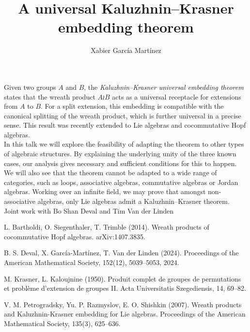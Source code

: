 \documentclass[11pt]{amsart}   %
\title{A universal Kaluzhnin--Krasner\\ embedding theorem}
\author{
	Xabier García Martínez
}
\date{}
\theoremstyle{plain}
\theoremstyle{definition}
\theoremstyle{remark}
\begin{document}
	
	
	\maketitle
	
Given two groups $A$ and $B$, the \emph{Kaluzhnin--Krasner universal embedding theorem} states that the wreath product $A\wr B$ acts as a universal receptacle for extensions from $A$ to $B$. For a split extension, this embedding is compatible with the canonical splitting of the wreath product, which is further universal in a precise sense. This result was recently extended to Lie algebras and cocommutative Hopf algebras. \\

In this talk we will explore the feasibility of adapting the theorem to other types of algebraic structures. By explaining the underlying unity of the three known cases, our analysis gives necessary and sufficient conditions for this to happen. \\

We will also see that the theorem cannot be adapted to a wide range of categories, such as loops, associative algebras, commutative algebras or Jordan algebras. Working over an infinite field, we may prove that amongst non-associative algebras, only Lie algebras admit a Kaluzhnin--Krasner theorem.\\

Joint work with Bo Shan Deval and Tim Van der Linden


\medskip


\begin{thebibliography}{}

%	
L. Bartholdi, O. Siegenthaler, T. Trimble (2014). Wreath products of cocommutative {H}opf algebras. arXiv:1407.3835.

B. S. Deval, X. García-Martínez, T. Van der Linden (2024).  Proceedings of the American Mathematical Society, 152(12), 5039–5053, 2024.

M. Krasner, L. Kaloujnine (1950). Produit complet de groupes de permutations et probl\`eme d'extension de groupes II. Acta Universitatis Szegediensis, 14, 69–82.

V. M. Petrogradsky, Yu. P. Razmyslov, E. O. Shishkin (2007). Wreath products and {K}aluzhnin-{K}rasner embedding for {L}ie algebras. Proceedings of the American Mathematical Society, 135(3), 625--636.

\end{thebibliography}
	
\end{document}
